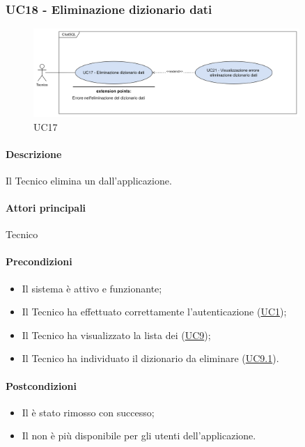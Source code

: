 \subsubsection{UC18 - Eliminazione dizionario dati}\label{UC18}

\begin{figure}[H]
  \centering
  \includegraphics[width=0.90\textwidth]{assets/uc17.png}
  \caption{UC17}
\end{figure}

\paragraph*{Descrizione}
Il Tecnico elimina un  dall'applicazione.

\paragraph*{Attori principali}
Tecnico

\paragraph*{Precondizioni}
\begin{itemize}
  \item Il sistema è attivo e funzionante;
  \item Il Tecnico ha effettuato correttamente l'autenticazione (\hyperref[UC1]{UC1});
  \item Il Tecnico ha visualizzato la lista dei  (\hyperref[UC9]{UC9});
  \item Il Tecnico ha individuato il dizionario da eliminare (\hyperref[UC9.1]{UC9.1}).
\end{itemize}

\paragraph*{Postcondizioni}
\begin{itemize}
  \item Il  è stato rimosso con successo;
  \item Il  non è più disponibile per gli utenti dell'applicazione.
\end{itemize}

